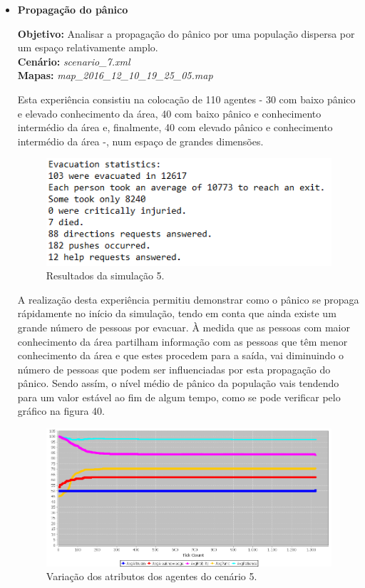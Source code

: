 \documentclass[12pt]{article}
\begin{document}
\begin{titlepage}
\begin{itemize}
\item \textbf{Propagação do pânico}

\textbf{Objetivo:} 
Analisar a propagação do pânico por uma população dispersa por um espaço relativamente amplo.
\\\textbf{Cenário:} 
\textit{scenario\_7.xml}
\\\textbf{Mapas:} 
\textit{map\_2016\_12\_10\_19\_25\_05.map}
\newline

Esta experiência consistiu na colocação de 110 agentes - 30 com baixo pânico e elevado conhecimento da área, 40 com baixo pânico e conhecimento intermédio da área e, finalmente, 40 com elevado pânico e conhecimento intermédio da área -, num espaço de grandes dimensões.

\begin{figure}[H]
	\centering
	\includegraphics[scale=1]{log_sc7.png}
	\caption{Resultados da simulação 5.}
	\label{log_sc7}
\end{figure}

A realização desta experiência permitiu demonstrar como o pânico se propaga rápidamente no início da simulação, tendo em conta que ainda existe um grande número de pessoas por evacuar. À medida que as pessoas com maior conhecimento da área partilham informação com as pessoas que têm menor conhecimento da área e que estes procedem para a saída, vai diminuindo o número de pessoas que podem ser influenciadas por esta propagação do pânico. Sendo assím, o nível médio de pânico da população vais tendendo para um valor estável ao fim de algum tempo, como se pode verificar pelo gráfico na figura 40. 

\begin{figure}[H]
	\centering
	\includegraphics[scale=.6]{graph_sc7.png}
	\caption{Variação dos atributos dos agentes do cenário 5.}
	\label{graph_sc7}
\end{figure}


\end{itemize}
\end{titlepage}
\end{document}
